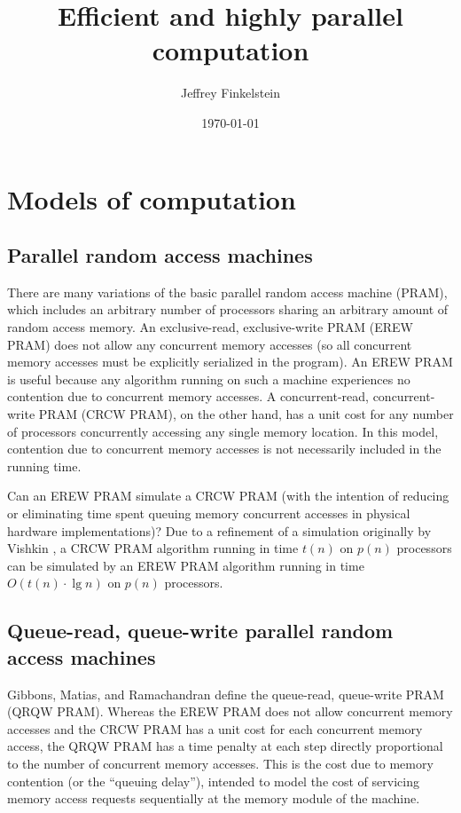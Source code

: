 \documentclass{article}
\author{Jef{}frey Finkelstein}
\date{\today}
\title{Efficient and highly parallel computation}
\begin{document}
\maketitle

\section{Models of computation}

\subsection{Parallel random access machines}
There are many variations of the basic parallel random access machine (PRAM), which includes an arbitrary number of processors sharing an arbitrary amount of random access memory.
An exclusive-read, exclusive-write PRAM (EREW PRAM) does not allow any concurrent memory accesses (so all concurrent memory accesses must be explicitly serialized in the program).
An EREW PRAM is useful because any algorithm running on such a machine experiences no contention due to concurrent memory accesses.
A concurrent-read, concurrent-write PRAM (CRCW PRAM), on the other hand, has a unit cost for any number of processors concurrently accessing any single memory location.
In this model, contention due to concurrent memory accesses is not necessarily included in the running time.

Can an EREW PRAM simulate a CRCW PRAM (with the intention of reducing or eliminating time spent queuing memory concurrent accesses in physical hardware implementations)?
Due to a refinement of a simulation originally by Vishkin \cite{vishkin83}, a CRCW PRAM algorithm running in time $t(n)$ on $p(n)$ processors can be simulated by an EREW PRAM algorithm running in time $O(t(n)\cdot\lg n)$ on $p(n)$ processors.

\subsection{Queue-read, queue-write parallel random access machines}
Gibbons, Matias, and Ramachandran \cite{gmr98a} define the queue-read, queue-write PRAM (QRQW PRAM).
Whereas the EREW PRAM does not allow concurrent memory accesses and the CRCW PRAM has a unit cost for each concurrent memory access, the QRQW PRAM has a time penalty at each step directly proportional to the number of concurrent memory accesses.
This is the cost due to memory contention (or the ``queuing delay''), intended to model the cost of servicing memory access requests sequentially at the memory module of the machine.
\end{document}
